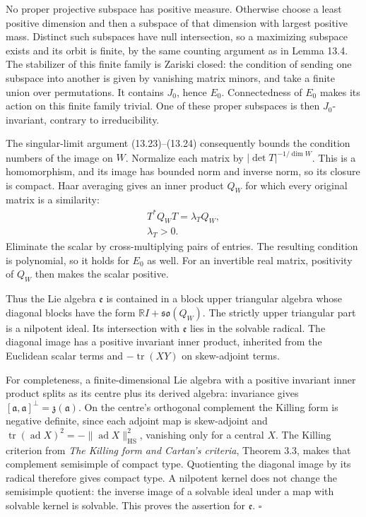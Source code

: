\documentclass[
  11pt,
]{article}
\begin{document}
No proper projective subspace has positive measure. Otherwise choose a
least positive dimension and then a subspace of that dimension with
largest positive mass. Distinct such subspaces have null intersection,
so a maximizing subspace exists and its orbit is finite, by the same
counting argument as in Lemma 13.4. The stabilizer of this finite family
is Zariski closed: the condition of sending one subspace into another is
given by vanishing matrix minors, and take a finite union over
permutations. It contains \(J_0\), hence \(E_0\). Connectedness of
\(E_0\) makes its action on this finite family trivial. One of these
proper subspaces is then \(J_0\)-invariant, contrary to irreducibility.

The singular-limit argument (13.23)--(13.24) consequently bounds the
condition numbers of the image on \(W\). Normalize each matrix by
\(|\det T|^{-1/\dim W}\). This is a homomorphism, and its image has
bounded norm and inverse norm, so its closure is compact. Haar averaging
gives an inner product \(Q_W\) for which every original matrix is a
similarity: \[
\begin{gathered}
T^*Q_WT=\lambda_TQ_W,\\
\lambda_T>0.
\end{gathered}
\tag{14.52}
\] Eliminate the scalar by cross-multiplying pairs of entries. The
resulting condition is polynomial, so it holds for \(E_0\) as well. For
an invertible real matrix, positivity of \(Q_W\) then makes the scalar
positive.

Thus the Lie algebra \(\mathfrak e\) is contained in a block upper
triangular algebra whose diagonal blocks have the form
\(\mathbb RI+\mathfrak{so}(Q_W)\). The strictly upper triangular part is
a nilpotent ideal. Its intersection with \(\mathfrak e\) lies in the
solvable radical. The diagonal image has a positive invariant inner
product, inherited from the Euclidean scalar terms and
\(-\operatorname{tr}(XY)\) on skew-adjoint terms.

For completeness, a finite-dimensional Lie algebra with a positive
invariant inner product splits as its centre plus its derived algebra:
invariance gives
\([\mathfrak a,\mathfrak a]^\perp=\mathfrak z(\mathfrak a)\). On the
centre's orthogonal complement the Killing form is negative definite,
since each adjoint map is skew-adjoint and
\(\operatorname{tr}(\operatorname{ad}X)^2=-\|\operatorname{ad}X\|_{\mathrm{HS}}^2\),
vanishing only for a central \(X\). The Killing criterion from \emph{The
Killing form and Cartan's criteria}, Theorem 3.3, makes that complement
semisimple of compact type. Quotienting the diagonal image by its
radical therefore gives compact type. A nilpotent kernel does not change
the semisimple quotient: the inverse image of a solvable ideal under a
map with solvable kernel is solvable. This proves the assertion for
\(\mathfrak e\). \(\square\)
\end{document}

